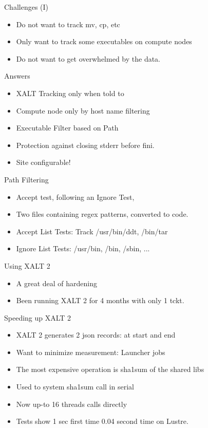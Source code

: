 \documentclass{beamer}
\begin{document}
\begin{frame}{Challenges (I)}
  \begin{itemize}
    \item Do not want to track mv, cp, etc
    \item Only want to track some executables on compute nodes
    \item Do not want to get overwhelmed by the data. 
  \end{itemize}
\end{frame}

\begin{frame}{Answers}
  \begin{itemize}
    \item XALT Tracking only when told to
    \item Compute node only by host name filtering
    \item Executable Filter based on Path
    \item Protection against closing stderr before fini.
    \item Site configurable!
  \end{itemize}
\end{frame}

\begin{frame}{Path Filtering}
  \begin{itemize}
    \item Accept test, following an Ignore Test,
    \item Two files containing regex patterns, converted to code.
    \item Accept List Tests: Track /usr/bin/ddt, /bin/tar
    \item Ignore List Tests: /usr/bin, /bin, /sbin, ...
  \end{itemize}
\end{frame}

\begin{frame}{Using XALT 2}
  \begin{itemize}
    \item A great deal of hardening 
    \item Been running XALT 2 for 4 months with only 1 tckt.
  \end{itemize}
\end{frame}

\begin{frame}{Speeding up XALT 2}
  \begin{itemize}
    \item XALT 2 generates 2 json records: at start and end
    \item Want to minimize measurement: Launcher jobs
    \item The most expensive operation is sha1sum of the shared libs
    \item Used to system sha1sum call in serial
    \item Now up-to 16 threads calls directly
    \item Tests show 1 sec first time 0.04 second time on Lustre.
  \end{itemize}
\end{frame}
\end{document}
